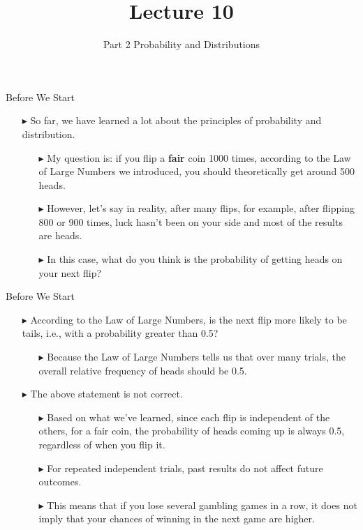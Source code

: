 \documentclass[12pt]{beamer}
\title[ECON2843]{Lecture 10}
\subtitle{Part 2 Probability and Distributions}
\date{}
\begin{document}
	\begin{frame}
		\titlepage
	\end{frame}
\begin{frame}{Before We Start}
\begin{itemize}
\item[\color{blue}$\blacktriangleright$] So far, we have learned a lot about the principles of probability and distribution.

\begin{itemize}
\item[\color{blue}$\blacktriangleright$] My question is: if you flip a {\bf fair} coin 1000 times, according to the Law of Large Numbers we introduced, you should theoretically get around 500 heads.
\item[\color{blue}$\blacktriangleright$] However, let's say in reality, after many flips, for example, after flipping 800 or 900 times, luck hasn't been on your side and most of the results are heads.
\item[\color{blue}$\blacktriangleright$] In this case, what do you think is the probability of getting heads on your next flip? 
\end{itemize}
\end{itemize}
\end{frame}
\begin{frame}{Before We Start}
	\begin{itemize}
\item[\color{blue}$\blacktriangleright$] According to the Law of Large Numbers, is the next flip more likely to be tails, i.e., with a probability greater than 0.5?
\begin{itemize}
\item[\color{blue}$\blacktriangleright$] Because the Law of Large Numbers tells us that over many trials, the overall relative frequency of heads should be 0.5.
\end{itemize}
\item[\color{blue}$\blacktriangleright$] The above statement is not correct.
\begin{itemize}
	\item[\color{blue}$\blacktriangleright$] Based on what we’ve learned, since each flip is independent of the others, for a fair coin, the probability of heads coming up is always 0.5, regardless of when you flip it.
	\item[\color{blue}$\blacktriangleright$] For repeated independent trials, past results do not affect future outcomes. 
	\item[\color{blue}$\blacktriangleright$] This means that if you lose several gambling games in a row, it does not imply that your chances of winning in the next game are higher.
\end{itemize}
\end{itemize}
\end{frame}
\end{document}
